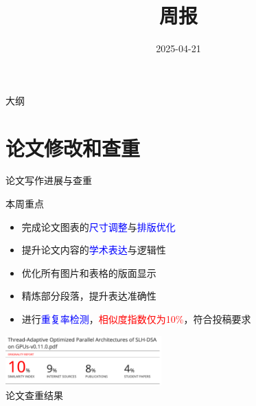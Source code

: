\documentclass{beamer}
\title{\LARGE{周报}}
\subtitle{}
\author{}
\date{2025-04-21}
\begin{document}
\begin{frame}
  \titlepage
\end{frame}

\begin{frame}{大纲}
  \tableofcontents
\end{frame}

\section{论文修改和查重}
\begin{frame}{论文写作进展与查重}
  \begin{block}{本周重点}
    \begin{itemize}
      \item 完成论文图表的\textcolor{blue}{尺寸调整}与\textcolor{blue}{排版优化}
      \item 提升论文内容的\textcolor{blue}{学术表达}与逻辑性
      \item 优化所有图片和表格的版面显示
      \item 精炼部分段落，提升表达准确性
      \item 进行\textcolor{blue}{重复率检测}，\textcolor{red}{相似度指数仅为10\%}，符合投稿要求
    \end{itemize}
  \end{block}
  \begin{center}
    \includegraphics[width=0.45\textwidth]{fig/reptition.png}\\
    \footnotesize{论文查重结果}
  \end{center}
\end{frame}
\end{document}
